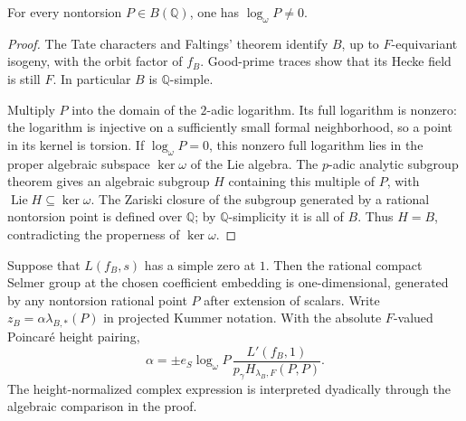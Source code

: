\begin{lemma}
\label{cm:log-nonzero}
For every nontorsion \(P\in B(\mathbb Q)\), one has
\(\log_\omega P\ne0\).
\end{lemma}

\begin{proof}
The Tate characters and Faltings' theorem \cite{Faltings83} identify \(B\), up to
\(F\)-equivariant isogeny, with the orbit factor of \(f_B\).
Good-prime traces show that its Hecke field is still \(F\).
In particular \(B\) is \(\mathbb Q\)-simple.

Multiply \(P\) into the domain of the \(2\)-adic logarithm.
Its full logarithm is nonzero: the logarithm is injective on a
sufficiently small formal neighborhood, so a point in its kernel is
torsion. If \(\log_\omega P=0\), this nonzero full logarithm lies in
the proper algebraic subspace \(\ker\omega\) of the Lie algebra.
The \(p\)-adic analytic subgroup theorem
\cite[Theorem~2.2]{FuchsPham15} gives an algebraic subgroup \(H\)
containing this multiple of \(P\), with
\(\operatorname{Lie}H\subseteq\ker\omega\).
The Zariski closure of the subgroup generated by a rational
nontorsion point is defined over \(\mathbb Q\); by
\(\mathbb Q\)-simplicity it is all of \(B\).
Thus \(H=B\), contradicting the properness of \(\ker\omega\).
\end{proof}

\begin{proposition}\label{cm:tame-log}
Suppose that \(L(f_B,s)\) has a simple zero at \(1\).
Then the rational compact Selmer group at the chosen coefficient
embedding is one-dimensional, generated by any nontorsion rational
point \(P\) after extension of scalars. Write
\(z_B=\alpha\lambda_{B,*}(P)\) in projected Kummer notation.
With the absolute \(F\)-valued Poincar\'e height pairing,
\[
 \alpha=\pm e_S\log_\omega P\,
       \frac{L'(f_B,1)}{p_\gamma H_{\lambda_B,F}(P,P)}.
 \tag{C4}\label{eq:C4}
\]
The height-normalized complex expression is interpreted dyadically
through the algebraic comparison in the proof.
\end{proposition}

